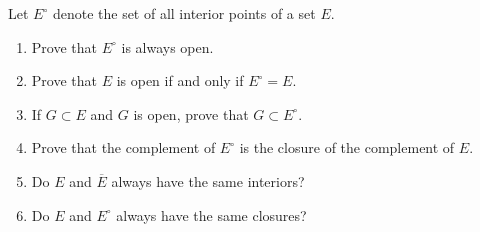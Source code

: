\documentclass[12 pt, letterpaper]{hmcpset}
\begin{document}
\begin{problem}
	Let $E^{\circ}$ denote the set of all interior points of a set $E$.
	\begin{enumerate}
		\item Prove that $E^{\circ}$ is always open.
		\item Prove that $E$ is open if and only if $E^{\circ} = E$.
		\item If $G \subset E$ and $G$ is open, prove that $G \subset E^{\circ}$.
		\item Prove that the complement of $E^{\circ}$ is the closure of the complement of $E$.
		\item Do $E$ and $\overline{E}$ always have the same interiors?
		\item Do $E$ and $E^{\circ}$ always have the same closures?
	\end{enumerate}
\end{problem}
\end{document}
